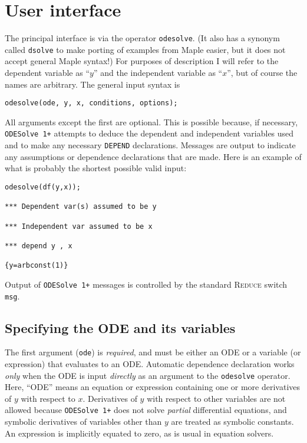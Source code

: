 \documentclass[a4paper]{article} %
\newcommand{\ODESolve}[1]{\texttt{ODESolve\,#1}}
\newcommand{\odesolve}{\texttt{odesolve}}
\newcommand{\REDUCE}{\textsc{Reduce}}
\begin{document}
\section{User interface}

The principal interface is via the operator \odesolve{}.  (It also has
a synonym called \texttt{dsolve} to make porting of examples from
Maple easier, but it does not accept general Maple syntax!)  For
purposes of description I will refer to the dependent variable as
``$y$'' and the independent variable as ``$x$'', but of course the
names are arbitrary.  The general input syntax is
\begin{verbatim}
odesolve(ode, y, x, conditions, options);
\end{verbatim}
All arguments except the first are optional.  This is possible
because, if necessary, \ODESolve{1+} attempts to deduce the dependent
and independent variables used and to make any necessary
\texttt{DEPEND} declarations.  Messages are output to indicate any
assumptions or dependence declarations that are made.  Here is an
example of what is probably the shortest possible valid input:
\begin{verbatim}
odesolve(df(y,x));

*** Dependent var(s) assumed to be y

*** Independent var assumed to be x

*** depend y , x

{y=arbconst(1)}
\end{verbatim}
Output of \ODESolve{1+} messages is controlled by the standard
\REDUCE{} switch \texttt{msg}.


\subsection{Specifying the ODE and its variables}

The first argument (\texttt{ode}) is \emph{required}, and must be
either an ODE or a variable (or expression) that evaluates to an
ODE\@.  Automatic dependence declaration works \emph{only} when the
ODE is input \emph{directly} as an argument to the \odesolve{}
operator.  Here, ``ODE'' means an equation or expression containing
one or more derivatives of $y$ with respect to $x$.  Derivatives of
$y$ with respect to other variables are not allowed because
\ODESolve{1+} does not solve \emph{partial} differential equations,
and symbolic derivatives of variables other than $y$ are treated as
symbolic constants.  An expression is implicitly equated to zero, as
is usual in equation solvers.
\end{document}

